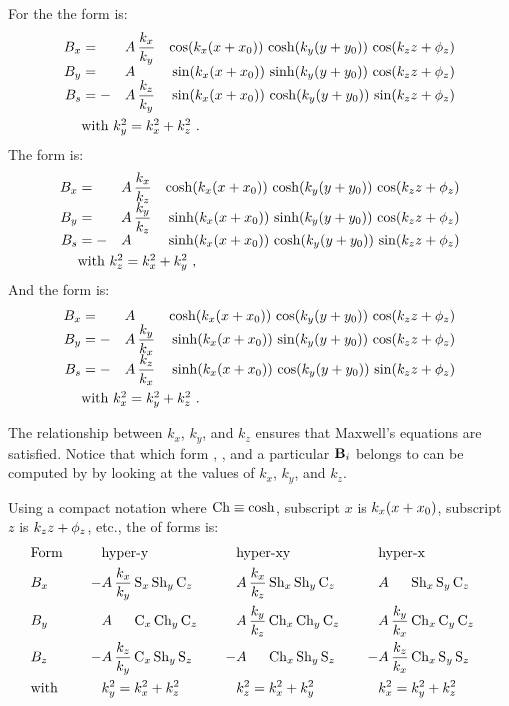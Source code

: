 For the   the  form is:
\begin{alignat}{4}
  B_x &=  &A \, &\dfrac{k_x}{k_y} & \cos(\kxx) \, \cosh(\kyy) \, \cos(\kzz) \CRNEG
  B_y &=  &A \, &                 & \sin(\kxx) \, \sinh(\kyy) \, \cos(\kzz) \CRNEG
  B_s &= -&A \, &\dfrac{k_z}{k_y} & \sin(\kxx) \, \cosh(\kyy) \, \sin(\kzz) \label{cm1} \\
  & \makebox[1pt][l]{with $k_y^2 = k_x^2 + k_z^2$ .} &&& \nonumber
\end{alignat}
The    form is:
\begin{alignat}{4}
  B_x &=  &A \, &\dfrac{k_x}{k_z} & \cosh(\kxx) \, \cosh(\kyy) \, \cos(\kzz) \CRNEG
  B_y &=  &A \, &\dfrac{k_y}{k_z} & \sinh(\kxx) \, \sinh(\kyy) \, \cos(\kzz) \CRNEG
  B_s &= -&A \, &                 & \sinh(\kxx) \, \cosh(\kyy) \, \sin(\kzz) \label{cm3} \\
  & \makebox[1pt][l]{with $k_z^2 = k_x^2 + k_y^2$ ,} &&& \nonumber
\end{alignat}
And the    form is:
\begin{alignat}{4}
  B_x &=  &A \, &                 & \cosh(\kxx) \, \cos(\kyy) \, \cos(\kzz) \CRNEG
  B_y &= -&A \, &\dfrac{k_y}{k_x} & \sinh(\kxx) \, \sin(\kyy) \, \cos(\kzz) \CRNEG
  B_s &= -&A \, &\dfrac{k_z}{k_x} & \sinh(\kxx) \, \cos(\kyy) \, \sin(\kzz) \label{cm5} \\
  & \makebox[1pt][l]{with $k_x^2 = k_y^2 + k_z^2$ .} &&& \nonumber
\end{alignat}

The relationship between $k_x$, $k_y$, and $k_z$ ensures that
Maxwell's equations are satisfied. Notice that which form
, , and  a particular ${\bf B}_i$
belongs to can be computed by \bmad by looking at the values of $k_x$,
$k_y$, and $k_z$.

Using a compact notation where $\text{Ch} \equiv \cosh$, subscript $x$ is $k_x (x + x_0)$, subscript $z$
is $k_z z + \phi_z$, etc., the   of forms is:
\begin{alignat}{7}
  & \text{Form} \quad  && \text{hyper-y} \quad && \text{hyper-xy} \quad && \text{hyper-x} \quad \CRNO
  & B_x  
    &-& A \, \dfrac{k_x}{k_y} \, \Se_x \, \Sh_y \, \Ce_z \quad
    & & A \, \dfrac{k_x}{k_z} \, \Sh_x \, \Sh_y \, \Ce_z \quad
    & & A \, \hphphp          \, \Sh_x \, \Se_y \, \Ce_z \quad \CRNO
  & B_y
    & & A \, \hphphp          \, \Ce_x \, \Ch_y \, \Ce_z \quad
    & & A \, \dfrac{k_y}{k_z} \, \Ch_x \, \Ch_y \, \Ce_z \quad
    & & A \, \dfrac{k_y}{k_x} \, \Ch_x \, \Ce_y \, \Ce_z \quad \label{family.y} \\
  & B_z
    &-& A \, \dfrac{k_z}{k_y} \, \Ce_x \, \Sh_y \, \Se_z \quad
    &-& A \, \hphphp          \, \Ch_x \, \Sh_y \, \Se_z \quad
    &-& A \, \dfrac{k_z}{k_x} \, \Ch_x \, \Se_y \, \Se_z \quad \CRNO
  & \text{with} 
    && k_y^2 = k_x^2 + k_z^2 
    && k_z^2 = k_x^2 + k_y^2
    && k_x^2 = k_y^2 + k_z^2 \nonumber
\end{alignat}

